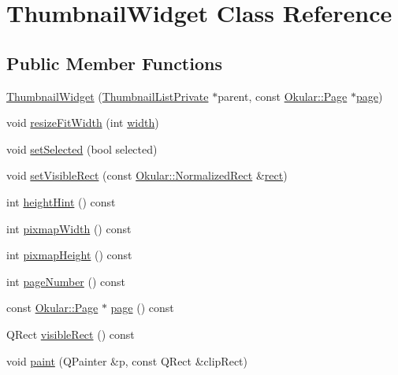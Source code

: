 \hypertarget{classThumbnailWidget}{\section{Thumbnail\+Widget Class Reference}
\label{classThumbnailWidget}
}
\subsection*{Public Member Functions}
\begin{DoxyCompactItemize}
\item 
\hyperlink{classThumbnailWidget_ad21975a798a67d1cfe92c3b3caea44b7}{Thumbnail\+Widget} (\hyperlink{classThumbnailListPrivate}{Thumbnail\+List\+Private} $\ast$parent, const \hyperlink{classOkular_1_1Page}{Okular\+::\+Page} $\ast$\hyperlink{classThumbnailWidget_a3b39edbf5519ac9c804aacb79e623d5d}{page})
\item 
void \hyperlink{classThumbnailWidget_ad7253ea3bd3e10f59c0aeab5cf3fadd8}{resize\+Fit\+Width} (int \hyperlink{classThumbnailWidget_ae49f53a3dd4b131ac08f0a8e96df08a2}{width})
\item 
void \hyperlink{classThumbnailWidget_a730b93ed157970ee052494fc1043191a}{set\+Selected} (bool selected)
\item 
void \hyperlink{classThumbnailWidget_adc31480cfb7b3502474c2c9e45b63f6e}{set\+Visible\+Rect} (const \hyperlink{classOkular_1_1NormalizedRect}{Okular\+::\+Normalized\+Rect} \&\hyperlink{classThumbnailWidget_aacf28a07e403c56da8961af86098cbb9}{rect})
\item 
int \hyperlink{classThumbnailWidget_a005de10f49f8b0a08579cc2993cd2472}{height\+Hint} () const 
\item 
int \hyperlink{classThumbnailWidget_ae3852b00d3b3bfdcbc016ab2076fce4c}{pixmap\+Width} () const 
\item 
int \hyperlink{classThumbnailWidget_a0d2a37e4299a6859e5336fb655114009}{pixmap\+Height} () const 
\item 
int \hyperlink{classThumbnailWidget_a1f2c0aa21032cb62975ce0f77e9e4ee3}{page\+Number} () const 
\item 
const \hyperlink{classOkular_1_1Page}{Okular\+::\+Page} $\ast$ \hyperlink{classThumbnailWidget_a3b39edbf5519ac9c804aacb79e623d5d}{page} () const 
\item 
Q\+Rect \hyperlink{classThumbnailWidget_a0258d51d26bdcf3b645514239768e1c7}{visible\+Rect} () const 
\item 
void \hyperlink{classThumbnailWidget_aeed7168eeeb5e9fff8ee0b1af9168669}{paint} (Q\+Painter \&p, const Q\+Rect \&clip\+Rect)

\end{DoxyCompactItemize}
